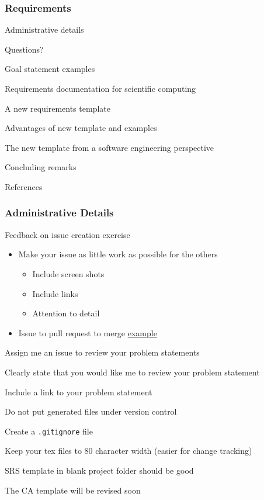 \documentclass[t,12pt,numbers,fleqn]{beamer}
\begin{document}



\begin{frame}
\frametitle{Requirements}

\bi
\item Administrative details
\item Questions?
\item Goal statement examples
\item Requirements documentation for scientific computing
\item A new requirements template
\item Advantages of new template and examples
\item The new template from a software engineering perspective
\item Concluding remarks
\item References
\ei
\end{frame}


\begin{frame}
\frametitle{Administrative Details}

\bi
\item Feedback on issue creation exercise
\begin{itemize}
\item Make your issue as little work as possible for the others
\begin{itemize}
\item Include screen shots
\item Include links
\item Attention to detail
\end{itemize}
\item Issue to pull request to merge
  \href{https://github.com/JacquesCarette/Drasil/issues/1892} {example}
\end{itemize}
\item Assign me an issue to review your problem statements
\bi
\item Clearly state that you would like me to review your problem statement
\item Include a link to your problem statement
\ei
\item Do not put generated files under version control
\item Create a \texttt{.gitignore} file
\item Keep your tex files to 80 character width (easier for change tracking)
\item SRS template in blank project folder should be good
\item The CA template will be revised soon
\ei

\end{frame}
\end{document}
